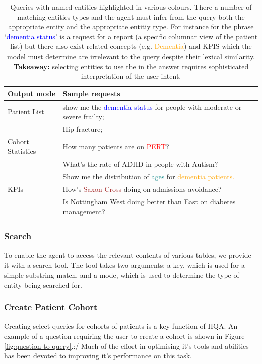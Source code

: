 \documentclass[11pt]{article}
\begin{document}
\begin{table}[t]
\centering
\begin{tabular}{|p{2cm}|p{5cm}|}
\hline
	Output mode & Sample requests \\
\hline
\hline
	Patient List	& show me the \textcolor{blue}{dementia status} for people with moderate or severe frailty; \\
			& Hip fracture; \\ 
\hline
	Cohort Statistics 	& How many patients are on \textcolor{red}{PERT}? \\
				& What's the rate of ADHD in people with Autism? \\
				& Show me the distribution of \textcolor{teal}{ages} for \textcolor{orange}{dementia patients.} \\
\hline
	KPIs 	& How's \textcolor{brown}{Saxon Cross} doing on admissions avoidance? \\
		& Is Nottingham West doing better than East on diabetes management? \\	
\hline
\end{tabular}
\caption{
	Queries with named entities highlighted in various colours.
	There a number of matching entities types and the agent must infer from the query both the appropriate entity and the appropriate entitiy type.
	For instance for the phrase `\textcolor{blue}{dementia status}' is a request for a report (a specific columnar view of the patient list) but there also exist related
	concepts (e.g. \textcolor{orange}{Dementia}) and KPIS which the model must determine are irrelevant to the query despite their lexical similarity.
	\\ \textbf{Takeaway:} selecting entities to use the in the answer requires sophisticated interpretation of the user intent.  
}
\label{tab:sample-queries}
\end{table}

\subsubsection{Search}
To enable the agent to access the relevant contents of various tables, we provide it with a search tool.
The tool takes two arguments: a key, which is used for a simple substring match, and a mode, which is used to determine the type of entity being searched
for.

\subsubsection{Create Patient Cohort}
Creating select queries for cohorts of patients is a key function of HQA.
An example of a question requiring the user to create a cohort is shown in Figure \ref{fig:question-to-query}.:/
Much of the effort in optimising it's tools and abilities has been devoted to improving it's performance on this task.
\end{document}
